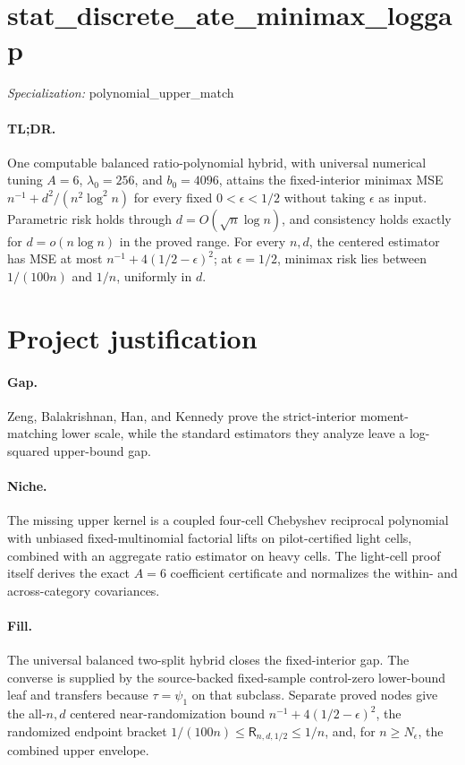 \documentclass{article}
\begin{document}
\section*{stat\_\allowbreak{}discrete\_\allowbreak{}ate\_\allowbreak{}minimax\_\allowbreak{}loggap}

\noindent\textit{Specialization:} polynomial\_\allowbreak{}upper\_\allowbreak{}match\par

\paragraph{TL;DR.} One computable balanced ratio-polynomial hybrid, with universal numerical tuning \(A=6\), \(\lambda_0=256\), and \(b_0=4096\), attains the fixed-interior minimax MSE \(n^{-1}+d^2/(n^2\log^2 n)\) for every fixed \(0<\epsilon<1/2\) without taking \(\epsilon\) as input. Parametric risk holds through \(d=O(\sqrt n\log n)\), and consistency holds exactly for \(d=o(n\log n)\) in the proved range. For every \(n,d\), the centered estimator has MSE at most \(n^{-1}+4(1/2-\epsilon)^2\); at \(\epsilon=1/2\), minimax risk lies between \(1/(100n)\) and \(1/n\), uniformly in \(d\).

\section{Project justification}

\paragraph{Gap.} Zeng, Balakrishnan, Han, and Kennedy prove the strict-interior moment-matching lower scale, while the standard estimators they analyze leave a log-squared upper-bound gap.

\paragraph{Niche.} The missing upper kernel is a coupled four-cell Chebyshev reciprocal polynomial with unbiased fixed-multinomial factorial lifts on pilot-certified light cells, combined with an aggregate ratio estimator on heavy cells. The light-cell proof itself derives the exact \(A=6\) coefficient certificate and normalizes the within- and across-category covariances.

\paragraph{Fill.} The universal balanced two-split hybrid closes the fixed-interior gap. The converse is supplied by the source-backed fixed-sample control-zero lower-bound leaf and transfers because \(\tau=\psi_1\) on that subclass. Separate proved nodes give the all-\(n,d\) centered near-randomization bound \(n^{-1}+4(1/2-\epsilon)^2\), the randomized endpoint bracket \(1/(100n)\le\mathsf R_{n,d,1/2}\le1/n\), and, for \(n\ge N_\epsilon\), the combined upper envelope.
\end{document}
